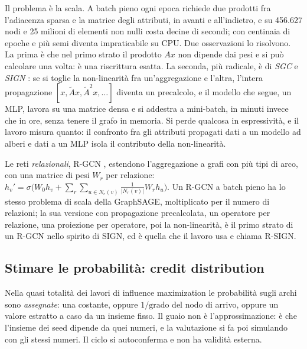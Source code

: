 \documentclass[11pt,a4paper]{article}
\begin{document}
Il problema è la scala. A batch pieno ogni epoca richiede due prodotti fra l'adiacenza sparsa e la matrice degli attributi, in avanti e all'indietro, e su 456.627 nodi e 25 milioni di elementi non nulli costa decine di secondi; con centinaia di epoche e più semi diventa impraticabile su CPU. Due osservazioni lo risolvono. La prima è che nel primo strato il prodotto $A x$ non dipende dai pesi e si può calcolare una volta: è una riscrittura esatta. La seconda, più radicale, è di \emph{SGC} \citep{wu2019} e \emph{SIGN} \citep{frasca2020}: se si toglie la non-linearità fra un'aggregazione e l'altra, l'intera propagazione $[x, \tilde{A} x, \tilde{A}^2 x, \ldots]$ diventa un precalcolo, e il modello che segue, un MLP, lavora su una matrice densa e si addestra a mini-batch, in minuti invece che in ore, senza tenere il grafo in memoria. Si perde qualcosa in espressività, e il lavoro misura quanto: il confronto fra gli attributi propagati dati a un modello ad alberi e dati a un MLP isola il contributo della non-linearità.

Le reti \emph{relazionali}, R-GCN \citep{schlichtkrull2018}, estendono l'aggregazione a grafi con più tipi di arco, con una matrice di pesi $W_r$ per relazione: $h_v' = \sigma\big(W_0 h_v + \sum_r \sum_{u \in N_r(v)} \frac{1}{|N_r(v)|} W_r h_u\big)$. Un R-GCN a batch pieno ha lo stesso problema di scala della GraphSAGE, moltiplicato per il numero di relazioni; la sua versione con propagazione precalcolata, un operatore per relazione, una proiezione per operatore, poi la non-linearità, è il primo strato di un R-GCN nello spirito di SIGN, ed è quella che il lavoro usa e chiama R-SIGN.

\subsection{Stimare le probabilità: credit distribution}
Nella quasi totalità dei lavori di influence maximization le probabilità sugli archi sono \emph{assegnate}: una costante, oppure $1/\text{grado}$ del nodo di arrivo, oppure un valore estratto a caso da un insieme fisso. Il guaio non è l'approssimazione: è che l'insieme dei seed dipende da quei numeri, e la valutazione si fa poi simulando con gli stessi numeri. Il ciclo si autoconferma e non ha validità esterna.
\end{document}
